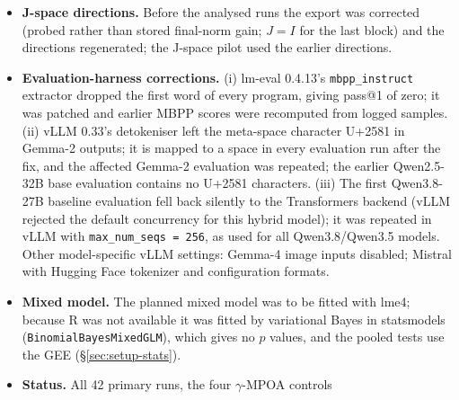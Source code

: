 \begin{itemize}
\item \textbf{J-space directions.} Before the analysed runs the export was
  corrected (probed rather than stored final-norm gain; $J=I$ for the last
  block) and the directions regenerated; the J-space pilot used the earlier
  directions.
\item \textbf{Evaluation-harness corrections.} (i) lm-eval 0.4.13's
  \texttt{mbpp\_instruct} extractor dropped the first word of every program,
  giving pass@1 of zero; it was patched and earlier MBPP scores were recomputed
  from logged samples. (ii) vLLM 0.33's detokeniser left the meta-space
  character U+2581 in Gemma-2 outputs; it is mapped to a space in every
  evaluation run after the fix, and the affected Gemma-2 evaluation was
  repeated; the earlier Qwen2.5-32B base evaluation contains no U+2581
  characters. (iii) The first Qwen3.8-27B
  baseline evaluation fell back silently to the Transformers backend (vLLM
  rejected the default concurrency for this hybrid model); it was repeated in
  vLLM with \texttt{max\_num\_seqs = 256}, as used for all Qwen3.8/Qwen3.5
  models. Other model-specific vLLM
  settings: Gemma-4 image inputs disabled; Mistral with Hugging Face tokenizer
  and configuration formats.
\item \textbf{Mixed model.} The planned mixed model was to be fitted with lme4;
  because R was not available it was fitted by variational Bayes in
  statsmodels (\texttt{BinomialBayesMixedGLM}), which gives no $p$ values, and
  the pooled tests use the GEE (\S\ref{sec:setup-stats}).
\item \textbf{Status.} All 42 primary runs, the four $\gamma$-MPOA controls

\end{itemize}
